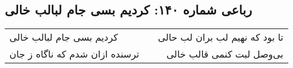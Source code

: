 \begin{center}
\section*{رباعی شماره ۱۴۰: کردیم بسی جام لبالب خالی}
\label{sec:140}
\begin{longtable}{l p{0.5cm} r}
کردیم بسی جام لبالب خالی
&&
تا بود که نهیم لب بران لب حالی
\\
ترسنده ازان شدم که ناگاه ز جان
&&
بی‌وصل لبت کنمی قالب خالی
\\
\end{longtable}
\end{center}
